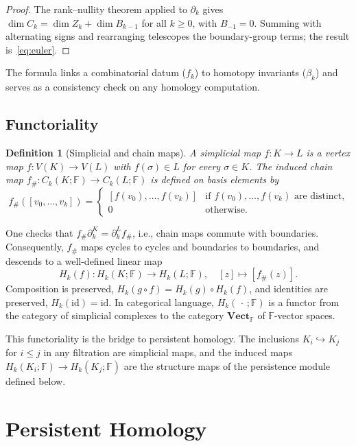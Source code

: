 \documentclass[onluarkali,ingilizce,yukseklisans,karton,LisansustuEgitim]{itutez}
\newtheorem{definition}{Definition}[chapter]
\providecommand{\F}{\mathbb{F}}
\providecommand{\1}{\mathbf{1}}
\providecommand{\Vect}{\mathbf{Vect}}
\begin{document}
\begin{proof}
The rank--nullity theorem applied to $\partial_k$ gives $\dim C_k=\dim Z_k+\dim B_{k-1}$ for all $k\geq 0$, with $B_{-1}=0$. Summing with alternating signs and rearranging telescopes the boundary-group terms; the result is~\eqref{eq:euler}.
\end{proof}

The formula links a combinatorial datum ($f_k$) to homotopy invariants ($\beta_k$) and serves as a consistency check on any homology computation.

\subsection{Functoriality}

\begin{definition}[Simplicial and chain maps]
\label{def:simplicial-map}
A \emph{simplicial map} $f\colon K\to L$ is a vertex map $f\colon V(K)\to V(L)$ with $f(\sigma)\in L$ for every $\sigma\in K$. The induced \emph{chain map} $f_\#\colon C_k(K;\F)\to C_k(L;\F)$ is defined on basis elements by
\[
  f_\#([v_0,\ldots,v_k])=
  \begin{cases}
    [f(v_0),\ldots,f(v_k)] & \text{if } f(v_0),\ldots,f(v_k)\text{ are distinct,}\\
    0 & \text{otherwise.}
  \end{cases}
\]
\end{definition}

One checks that $f_\#\partial_k^K=\partial_k^L f_\#$, i.e., chain maps commute with boundaries. Consequently, $f_\#$ maps cycles to cycles and boundaries to boundaries, and descends to a well-defined linear map
\[
  H_k(f)\colon H_k(K;\F)\longrightarrow H_k(L;\F),\quad [z]\longmapsto[f_\#(z)].
\]
Composition is preserved, $H_k(g\circ f)=H_k(g)\circ H_k(f)$, and identities are preserved, $H_k(\mathrm{id})=\mathrm{id}$. In categorical language, $H_k(\,\cdot\,;\F)$ is a functor from the category of simplicial complexes to the category $\Vect_\F$ of $\F$-vector spaces.

This functoriality is the bridge to persistent homology. The inclusions $K_i\hookrightarrow K_j$ for $i\leq j$ in any filtration are simplicial maps, and the induced maps $H_k(K_i;\F)\to H_k(K_j;\F)$ are the structure maps of the persistence module defined below.

\section{Persistent Homology}
\label{subsec:ph}
\end{document}

